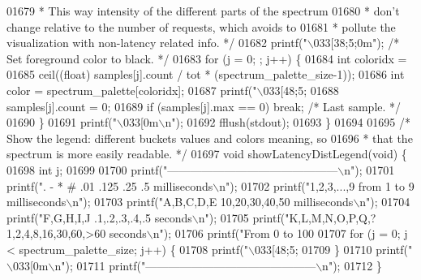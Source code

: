\begin{DoxyCode}
{{{{{{{{{{{{{{{{{{{{{{{{{{{{{{{{{{{{{{{{{{{{01679 \textcolor{comment}{     * This way intensity of the different parts of the spectrum}
01680 \textcolor{comment}{     * don't change relative to the number of requests, which avoids to}
01681 \textcolor{comment}{     * pollute the visualization with non-latency related info. */}
01682     printf(\textcolor{stringliteral}{"\(\backslash\)033[38;5;0m"}); \textcolor{comment}{/* Set foreground color to black. */}
01683     \textcolor{keywordflow}{for} (j = 0; ; j++) \{
01684         \textcolor{keywordtype}{int} coloridx =
01685             ceil((\textcolor{keywordtype}{float}) samples[j].count / tot * (spectrum\_palette\_size-1));
01686         \textcolor{keywordtype}{int} color = spectrum\_palette[coloridx];
01687         printf(\textcolor{stringliteral}{"\(\backslash\)033[48;5;%
01688         samples[j].count = 0;
01689         \textcolor{keywordflow}{if} (samples[j].max == 0) \textcolor{keywordflow}{break}; \textcolor{comment}{/* Last sample. */}
01690     \}
01691     printf(\textcolor{stringliteral}{"\(\backslash\)033[0m\(\backslash\)n"});
01692     fflush(stdout);
01693 \}
01694 
01695 \textcolor{comment}{/* Show the legend: different buckets values and colors meaning, so}
01696 \textcolor{comment}{ * that the spectrum is more easily readable. */}
01697 \textcolor{keywordtype}{void} showLatencyDistLegend(\textcolor{keywordtype}{void}) \{
01698     \textcolor{keywordtype}{int} j;
01699 
01700     printf(\textcolor{stringliteral}{"---------------------------------------------\(\backslash\)n"});
01701     printf(\textcolor{stringliteral}{". - * #          .01 .125 .25 .5 milliseconds\(\backslash\)n"});
01702     printf(\textcolor{stringliteral}{"1,2,3,...,9      from 1 to 9     milliseconds\(\backslash\)n"});
01703     printf(\textcolor{stringliteral}{"A,B,C,D,E        10,20,30,40,50  milliseconds\(\backslash\)n"});
01704     printf(\textcolor{stringliteral}{"F,G,H,I,J        .1,.2,.3,.4,.5       seconds\(\backslash\)n"});
01705     printf(\textcolor{stringliteral}{"K,L,M,N,O,P,Q,?  1,2,4,8,16,30,60,>60 seconds\(\backslash\)n"});
01706     printf(\textcolor{stringliteral}{"From 0 to 100%
01707     \textcolor{keywordflow}{for} (j = 0; j < spectrum\_palette\_size; j++) \{
01708         printf(\textcolor{stringliteral}{"\(\backslash\)033[48;5;%
01709     \}
01710     printf(\textcolor{stringliteral}{"\(\backslash\)033[0m\(\backslash\)n"});
01711     printf(\textcolor{stringliteral}{"---------------------------------------------\(\backslash\)n"});
01712 \}
}}}}}}}}}}}}}}}}}}}}}}}}}}}}}}}}}}}}}}}}}}}}}}}
\end{DoxyCode}
